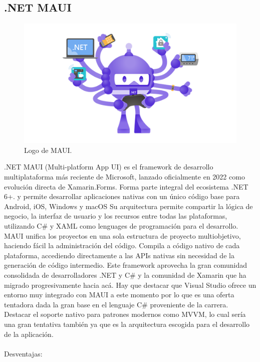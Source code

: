 \subsection{.NET MAUI}
\begin{figure}[h]
    \centering
    \includegraphics[scale=0.15]{Graphics/MAUI.png}
    \caption{Logo de MAUI.}
    \label{fig:figura10}
\end{figure}
.NET MAUI (Multi-platform App UI) es el framework de desarrollo multiplataforma más reciente de Microsoft, lanzado oficialmente en 2022 como evolución directa de Xamarin.Forms. Forma parte integral del ecosistema .NET 6+.
y permite desarrollar aplicaciones nativas con un único código base para Android, iOS, Windows y macOS
Su arquitectura permite compartir la lógica de negocio, la interfaz de usuario y los recursos entre todas las plataformas, utilizando C\# y XAML como lenguages de programación para el desarrollo.
MAUI unifica los proyectos en una sola estructura de proyecto multiobjetivo, haciendo fácil la administración del código. Compila a código nativo de cada plataforma, accediendo directamente a las APIs nativas sin necesidad de la generación de código intermedio.
Este framework aprovecha la gran comunidad consolidada de desarrolladores .NET y C\# y la comunidad de Xamarin que ha migrado progresivamente hacia acá.
Hay que destacar que Visual Studio ofrece un entorno muy integrado con MAUI a este momento por lo que es una oferta tentadora dada la gran base en el lenguaje C\# proveniente de la carrera.
Destacar el soporte nativo para patrones modernos como MVVM, lo cual sería una gran tentativa también ya que es la arquitectura escogida para el desarrollo de la aplicación.\\\\
Desventajas:
